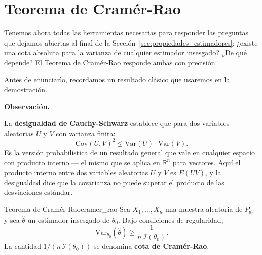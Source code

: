 \documentclass[12pt, a4paper]{book}
\newenvironment{observacion}{%
    \par\medskip\noindent\textbf{\color{azul}Observaci\'{o}n.}\enspace\itshape
}{\par\medskip}
\numberwithin{equation}{chapter}
\begin{document}
\section{Teorema de Cram\'{e}r-Rao}
\label{sec:cramer_rao}

Tenemos ahora todas las herramientas necesarias para
responder las preguntas que dejamos abiertas al final de
la Secci\'{o}n~\ref{sec:propiedades_estimadores}: ¿existe
una cota absoluta para la varianza de cualquier estimador
insesgado? ¿De qu\'{e} depende? El Teorema de
Cram\'{e}r-Rao responde ambas con precisi\'{o}n.

Antes de enunciarlo, recordamos un resultado cl\'{a}sico
que usaremos en la demostraci\'{o}n.

\begin{observacion}
	La \textbf{desigualdad de Cauchy-Schwarz} establece
	que para dos variables aleatorias $U$ y $V$ con
	varianza finita:
	\[
	\mathrm{Cov}(U, V)^2 \leq
	\mathrm{Var}(U)\cdot\mathrm{Var}(V).
	\]
	Es la versi\'{o}n probabil\'{i}stica de un resultado
	general que vale en cualquier espacio con producto
	interno --- el mismo que se aplica en $\mathbb{R}^n$
	para vectores. Aqu\'{i} el producto interno entre
	dos variables aleatorias $U$ y $V$ es $E(UV)$, y la
	desigualdad dice que la covarianza no puede superar
	el producto de las desviaciones est\'{a}ndar.
\end{observacion}

\begin{teorema}{Teorema de Cram\'{e}r-Rao}{cramer_rao}
	Sea $X_1, \ldots, X_n$ una muestra aleatoria de
	$P_{\theta_0}$ y sea $\hat{\theta}$ un estimador
	insesgado de $\theta_0$. Bajo condiciones de
	regularidad,
	\[
	\mathrm{Var}_{\theta_0}(\hat{\theta})
	\geq \frac{1}{n\,\mathcal{I}(\theta_0)}.
	\]
	La cantidad $1/(n\,\mathcal{I}(\theta_0))$ se denomina
	\textbf{cota de Cram\'{e}r-Rao}.
\end{teorema}
\end{document}
